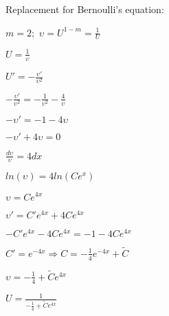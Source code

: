 \documentclass{article}
\begin{document}
Replacement for Bernoulli's equation:
\begin{left}
\begin{spacing}{2.2}
$m=2; $ $\displaystyle \upsilon=U^{1-m}=\frac{1}{U}$

$\displaystyle U=\frac{1}{\upsilon}$

$\displaystyle U'=-\frac{\upsilon'}{\upsilon^2}$

$\displaystyle -\frac{\upsilon'}{\upsilon^2}=-\frac{1}{\upsilon^2}-\frac{4}{\upsilon}$

$-\upsilon'=-1-4\upsilon$

$-\upsilon'+4\upsilon=0$

$\displaystyle \frac{d\upsilon}{\upsilon}=4dx$

$ln(\upsilon)=4ln(Ce^x)$

$\upsilon=Ce^{4x}$

$\upsilon'=C'e^{4x}+4Ce^{4x}$

$-C'e^{4x}-4Ce^{4x}=-1-4Ce^{4x}$

$\displaystyle C'=e^{-4x} \Rightarrow C=-\frac{1}{4}e^{-4x}+\widetilde{C}$

$\displaystyle \upsilon=-\frac{1}{4}+\widetilde{C}e^{4x}$

$\displaystyle U=\frac{1}{-\frac{1}{4}+\widetilde{C}e^{4x}}$

\end{spacing}
\end{left}
\end{document}
